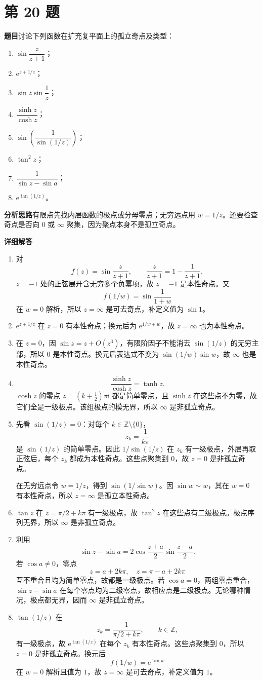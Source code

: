 \documentclass[UTF8,11pt,a4paper,fontset=fandol]{ctexart}
\newcommand{\ii}{\mathrm{i}}
\newcommand{\ee}{\mathrm{e}}
\newcommand{\idea}{\par\medskip\Needspace{3\baselineskip}\noindent\textbf{分析思路}\quad}
\newcommand{\answer}{\par\medskip\Needspace{3\baselineskip}\noindent\textbf{详细解答}\quad}
\newcommand{\problem}[1]{\par\Needspace{8\baselineskip}\section*{第 #1 题}\addcontentsline{toc}{section}{第 #1 题}}
\begin{document}
{\problem{20}
\textbf{题目}\quad 讨论下列函数在扩充复平面上的孤立奇点及类型：
\begin{enumerate}
\item $\sin\dfrac z{z+1}$；
\item $\ee^{z+1/z}$；
\item $\sin z\sin\dfrac1z$；
\item $\dfrac{\sinh z}{\cosh z}$；
\item $\sin\!\left(\dfrac1{\sin(1/z)}\right)$；
\item $\tan^2z$；
\item $\dfrac1{\sin z-\sin a}$；
\item $\ee^{\tan(1/z)}$。
\end{enumerate}
\idea 有限点先找内层函数的极点或分母零点；无穷远点用 $w=1/z$。还要检查奇点是否向 $0$ 或 $\infty$ 聚集，因为聚点本身不是孤立奇点。
\answer
\begin{enumerate}
\item 对
\[
f(z)=\sin\frac z{z+1},
\qquad
\frac z{z+1}=1-\frac1{z+1},
\]
$z=-1$ 处的正弦展开含无穷多个负幂项，故 $z=-1$ 是本性奇点。又
\[
f(1/w)=\sin\frac1{1+w}
\]
在 $w=0$ 解析，所以 $z=\infty$ 是可去奇点，补定义值为 $\sin1$。
\item $\ee^{z+1/z}$ 在 $z=0$ 有本性奇点；换元后为 $\ee^{1/w+w}$，故 $z=\infty$ 也为本性奇点。
\item 在 $z=0$，因 $\sin z=z+O(z^3)$，有限阶因子不能消去 $\sin(1/z)$ 的无穷主部，所以 $0$ 是本性奇点。换元后表达式不变为 $\sin(1/w)\sin w$，故 $\infty$ 也是本性奇点。
\item
\[
\frac{\sinh z}{\cosh z}=\tanh z.
\]
$\cosh z$ 的零点 $z=(k+\frac12)\pi\ii$ 都是简单零点，且 $\sinh z$ 在这些点不为零，故它们全是一级极点。该组极点的模无界，所以 $\infty$ 是非孤立奇点。
\item 先看 $\sin(1/z)=0$：对每个 $k\in\mathbb Z\setminus\{0\}$，
\[
z_k=\frac1{k\pi}
\]
是 $\sin(1/z)$ 的简单零点。因此 $1/\sin(1/z)$ 在 $z_k$ 有一级极点，外层再取正弦后，每个 $z_k$ 都成为本性奇点。这些点聚集到 $0$，故 $z=0$ 是非孤立奇点。

在无穷远点令 $w=1/z$，得到 $\sin(1/\sin w)$。因 $\sin w\sim w$，其在 $w=0$ 有本性奇点，所以 $z=\infty$ 是孤立本性奇点。
\item $\tan z$ 在 $z=\pi/2+k\pi$ 有一级极点，故 $\tan^2z$ 在这些点有二级极点。极点序列无界，所以 $\infty$ 是非孤立奇点。
\item 利用
\[
\sin z-\sin a
=2\cos\frac{z+a}{2}\sin\frac{z-a}{2}.
\]
若 $\cos a\ne0$，零点
\[
z=a+2k\pi,\quad z=\pi-a+2k\pi
\]
互不重合且均为简单零点，故都是一级极点。若 $\cos a=0$，两组零点重合，$\sin z-\sin a$ 在每个零点均为二级零点，故相应点是二级极点。无论哪种情况，极点都无界，因而 $\infty$ 是非孤立奇点。
\item $\tan(1/z)$ 在
\[
z_k=\frac1{\pi/2+k\pi},\qquad k\in\mathbb Z,
\]
有一级极点，故 $\ee^{\tan(1/z)}$ 在每个 $z_k$ 有本性奇点。这些点聚集到 $0$，所以 $z=0$ 是非孤立奇点。换元后
\[
f(1/w)=\ee^{\tan w}
\]
在 $w=0$ 解析且值为 $1$，故 $z=\infty$ 是可去奇点，补定义值为 $1$。
\end{enumerate}

}
\end{document}
